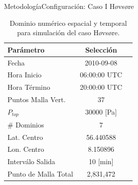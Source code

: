 \documentclass[mathserif,10pt]{beamer}
\begin{document}
\begin{frame}{Metodología}{Configuración: Caso I Høvsøre}
	\begin{table}[h!]
		\caption{Dominio numérico espacial y temporal para simulación del caso Høvsøre.}\label{tab:05_config_hov}
		\centering\footnotesize
		\begin{tabular}{lcc}
			\toprule
			Parámetro & Selección \\
			\midrule
			Fecha	 	 & 2010-09-08   \\
			Hora Inicio	 	 & 06:00:00   UTC \\
			Hora Término	 		 & 20:00:00 UTC  \\
			Puntos Malla Vert.	 	 & 37   \\
			$P_{top}$ 	& 30000 [Pa]\\
			\# Dominios	& 7   \\
			Lat. Centro	& 56.440588   \\
			Lon. Centro	& 8.150896   \\
			Interválo Salida & 10 [min]\\
			Punto de Malla Total & 2,831,472\\
			\bottomrule
		\end{tabular}
	\end{table}
\end{frame}
\end{document}
